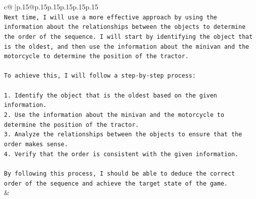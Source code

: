 \documentclass{article}
\begin{document}
{\begin{supertabular}{c@{$\;$}|p{.15\linewidth}@{}p{.15\linewidth}p{.15\linewidth}p{.15\linewidth}p{.15\linewidth}p{.15\linewidth}}
{{{\\ 
\texttt{Next time, I will use a more effective approach by using the information about the relationships between the objects to determine the order of the sequence. I will start by identifying the object that is the oldest, and then use the information about the minivan and the motorcycle to determine the position of the tractor.} \\
\\ 
\texttt{To achieve this, I will follow a step{-}by{-}step process:} \\
\\ 
\texttt{1. Identify the object that is the oldest based on the given information.} \\
\texttt{2. Use the information about the minivan and the motorcycle to determine the position of the tractor.} \\
\texttt{3. Analyze the relationships between the objects to ensure that the order makes sense.} \\
\texttt{4. Verify that the order is consistent with the given information.} \\
\\ 
\texttt{By following this process, I should be able to deduce the correct order of the sequence and achieve the target state of the game.} \\
            }
        }
    }
    & \\ \\

\end{supertabular}
}
\end{document}
